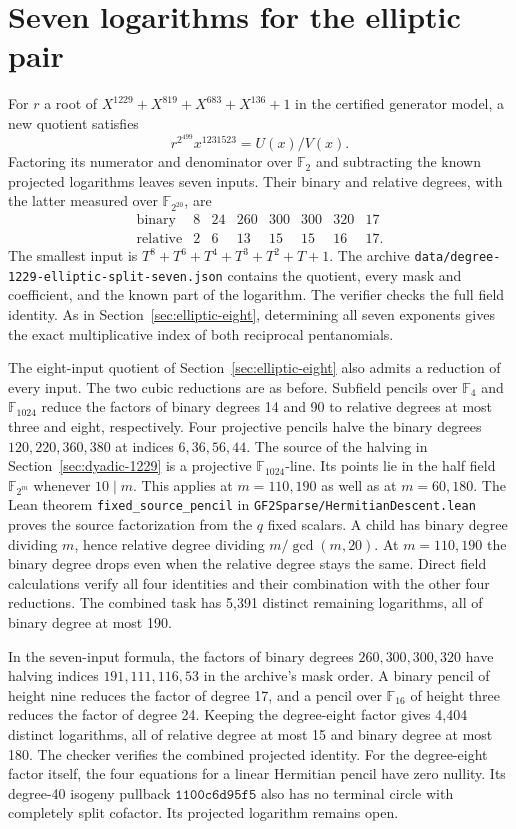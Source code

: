 \documentclass[11pt]{article}
\newcommand{\F}{\mathbb F_2}
\begin{document}
\section{Seven logarithms for the elliptic pair}
\label{sec:elliptic-seven}
For \(r\) a root of \(X^{1229}+X^{819}+X^{683}+X^{136}+1\) in
the certified generator model, a new quotient satisfies
\[
                 r^{2^{499}}x^{1231523}=U(x)/V(x).
\]
Factoring its numerator and denominator over \(\F\) and subtracting
the known projected logarithms leaves seven inputs. Their binary
and relative degrees, with the latter measured over \(\mathbb F_{2^{20}}\),
are
\[
\begin{array}{c|rrrrrrr}
 \text{binary}&8&24&260&300&300&320&17\\
 \text{relative}&2&6&13&15&15&16&17 .
\end{array}
\]
The smallest input is \(T^8+T^6+T^4+T^3+T^2+T+1\).
The archive \nolinkurl{data/degree-1229-elliptic-split-seven.json}
contains the quotient, every mask and coefficient, and the known
part of the logarithm. The verifier checks the full field identity.
As in Section~\ref{sec:elliptic-eight}, determining all seven
exponents gives the exact multiplicative index of both reciprocal
pentanomials.

The eight-input quotient of Section~\ref{sec:elliptic-eight} also
admits a reduction of every input. The two cubic reductions are
as before. Subfield pencils over \(\mathbb F_4\) and
\(\mathbb F_{1024}\) reduce the factors of binary degrees 14 and 90
to relative degrees at most three and eight, respectively.
Four projective pencils halve the binary degrees \(120,220,360,380\)
at indices \(6,36,56,44\). The source of the halving in
Section~\ref{sec:dyadic-1229} is a projective
\(\mathbb F_{1024}\)-line. Its points lie in the half field
\(\mathbb F_{2^m}\) whenever \(10\mid m\). This applies at
\(m=110,190\) as well as at \(m=60,180\). The Lean theorem
\nolinkurl{fixed_source_pencil} in
\nolinkurl{GF2Sparse/HermitianDescent.lean} proves the source
factorization from the \(q\) fixed scalars. A child has binary
degree dividing \(m\), hence relative degree dividing
\(m/\gcd(m,20)\). At \(m=110,190\) the binary degree drops even
when the relative degree stays the same. Direct field calculations
verify all four identities and their combination with the other
four reductions. The combined task has 5,391 distinct remaining
logarithms, all of binary degree at most 190.

In the seven-input formula, the factors of binary degrees
\(260,300,300,320\) have halving indices \(191,111,116,53\)
in the archive's mask order. A binary pencil of height nine reduces
the factor of degree 17, and a pencil over \(\mathbb F_{16}\) of
height three reduces the factor of degree 24. Keeping the degree-eight
factor gives 4,404 distinct logarithms, all of relative degree at
most 15 and binary degree at most 180. The checker verifies the
combined projected identity. For the degree-eight factor itself,
the four equations for a linear Hermitian pencil have zero nullity.
Its degree-40 isogeny pullback \(\mathtt{1100c6d95f5}\) also has no
terminal circle with completely split cofactor. Its projected
logarithm remains open.
\end{document}
